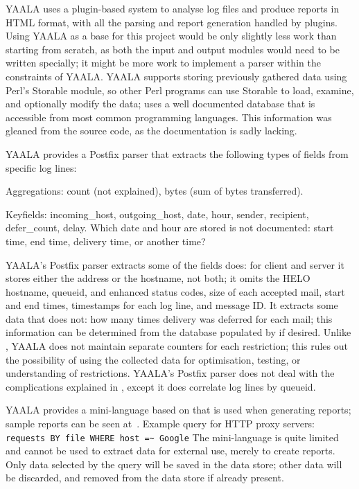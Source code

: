 YAALA uses a plugin-based system to analyse log files and produce reports
in HTML format, with all the parsing and report generation handled by
plugins.  Using YAALA as a base for this project would be only slightly
less work than starting from scratch, as both the input and output modules
would need to be written specially; it might be more work to implement a
parser within the constraints of YAALA\@.  YAALA supports storing
previously gathered data using Perl's Storable module, so other Perl
programs can use Storable to load, examine, and optionally modify the data;
\parsername{} uses a well documented database that is accessible from most
common programming languages.  This information was gleaned from the source
code, as the documentation is sadly lacking.

YAALA provides a Postfix parser that extracts the following types of fields
from specific log lines:

\begin{eqlist}

    \item [Aggregations:] count (not explained), bytes (sum of bytes
        transferred).

    \item [Keyfields:] incoming\_host, outgoing\_host, date, hour, sender,
        recipient, defer\_count, delay.  Which date and hour are stored is
        not documented: start time, end time, delivery time, or another
        time?

\end{eqlist}

\noindent{}YAALA's Postfix parser extracts some of the fields \parsername{}
does: for client and server it stores either the  address or
the hostname, not both; it omits the HELO hostname, queueid, 
and enhanced status codes, size of each accepted mail, start and end times,
timestamps for each log line, and message ID\@.  It extracts some data that
\parsername{} does not: how many times delivery was deferred for each mail;
this information can be determined from the database populated by
\parsername{} if desired.  Unlike \parsername{}, YAALA does not maintain
separate counters for each restriction; this rules out the possibility of
using the collected data for optimisation, testing, or understanding of
restrictions.  YAALA's Postfix parser does not deal with the complications
explained in , except it does correlate log lines
by queueid.

YAALA provides a mini-language based on  that is used when
generating reports; sample reports can be seen
at~.  Example
query for HTTP proxy servers: \newline{} \tab{} \texttt{requests BY file
WHERE host =\~{} Google} \newline{} The mini-language is quite limited and
cannot be used to extract data for external use, merely to create reports.
Only data selected by the query will be saved in the data store; other data
will be discarded, and removed from the data store if already present.


